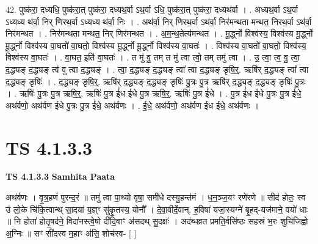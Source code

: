 \documentclass[17pt]{extarticle}
\begin{document}
42. पुष्क॑रा॒ दध्यधि॒ पुष्क॑रा॒त् पुष्क॑रा॒ दध्यथ॒र्वा ऽथ॒र्वा ऽधि॒ पुष्क॑रा॒त् पुष्क॑रा॒ दध्यथ॑र्वा । . अध्यथ॒र्वा ऽथ॒र्वा ऽध्यध्य थ॑र्वा॒ निर् णिरथ॒र्वा ऽध्यध्य थ॑र्वा॒ निः । . अथ॑र्वा॒ निर् णिरथ॒र्वा ऽथ॑र्वा॒ निर॑मन्थता मन्थत॒ निरथ॒र्वा ऽथ॑र्वा॒ निर॑मन्थत । . निर॑मन्थता मन्थत॒ निर् णिर॑मन्थत । . अ॒म॒न्थ॒तेत्य॑मन्थत । . मू॒र्द्ध्नो विश्व॑स्य॒ विश्व॑स्य मू॒र्द्ध्नो मू॒र्द्ध्नो विश्व॑स्य वा॒घतो॑ वा॒घतो॒ विश्व॑स्य मू॒र्द्ध्नो मू॒र्द्ध्नो विश्व॑स्य वा॒घतः॑ । . विश्व॑स्य वा॒घतो॑ वा॒घतो॒ विश्व॑स्य॒ विश्व॑स्य वा॒घतः॑ । . वा॒घत॒ इति॑ वा॒घतः॑ । . त मु॑ वु॒ तम् त मु॑ त्वा त्वो॒ तम् तमु॑ त्वा । . उ॒ त्वा॒ त्व॒ वु॒ त्वा॒ द॒द्ध्यङ् द॒द्ध्यङ् त्व॑ वु त्वा द॒द्ध्यङ् । . त्वा॒ द॒द्ध्यङ् द॒द्ध्यङ् त्वा᳚ त्वा द॒द्ध्यङ् ङृषि॒र्॒. ऋषि॑र् द॒द्ध्यङ् त्वा᳚ त्वा द॒द्ध्यङ् ङृषिः॑ । . द॒द्ध्यङ् ङृषि॒र्॒. ऋषि॑र् द॒द्ध्यङ् द॒द्ध्यङ् ङृषिः॑ पु॒त्रः पु॒त्र ऋषि॑र् द॒द्ध्यङ् 
द॒द्ध्यङ् ङृषिः॑ पु॒त्रः । . ऋषिः॑ पु॒त्रः पु॒त्र ऋषि॒र्॒. ऋषिः॑ पु॒त्र ई॑ध ईधे पु॒त्र ऋषि॒र्॒. ऋषिः॑ पु॒त्र ई॑धे । . पु॒त्र ई॑ध ईधे पु॒त्रः पु॒त्र ई॑धे॒ अथ॑र्वणो॒ अथ॑र्वण ईधे पु॒त्रः पु॒त्र ई॑धे॒ अथ॑र्वणः । . ई॒धे॒ अथ॑र्वणो॒ अथ॑र्वण ईध ईधे॒ अथ॑र्वणः । \newline
\pagebreak
{}

\section{ TS 4.1.3.3 }

\textbf{TS 4.1.3.3 } \newline
\textbf{Samhita Paata} \newline

अथ॑र्वणः । वृ॒त्र॒हणं॑ पुरन्द॒रं ॥ तमु॑ त्वा पा॒थ्यो वृषा॒ समी॑धे दस्यु॒हन्त॑मं । ध॒न॒ञ्ज॒यꣳ रणे॑रणे ॥ सीद॑ होतः॒ स्व उ॑ लो॒के चि॑कि॒त्वान्थ् सा॒दया॑ य॒ज्ञ्ꣳ सु॑कृ॒तस्य॒ योनौ᳚ । दे॒वा॒वीर्दे॒वान्. ह॒विषा॑ यजा॒स्यग्ने॑ बृ॒हद्-यज॑माने॒ वयो॑ धाः ॥ नि होता॑ होतृ॒षद॑ने॒ विदा॑नस्त्वे॒षो दी॑दि॒वाꣳ अ॑सदथ् सु॒दक्षः॑ । अद॑ब्धव्रत प्रमति॒र्वसि॑ष्ठः सहस्रं भ॒रः शुचि॑जिह्वो अ॒ग्निः ॥ सꣳ सी॑दस्व म॒हाꣳ अ॑सि॒ शोच॑स्व- [  ] \newline
\end{document}
